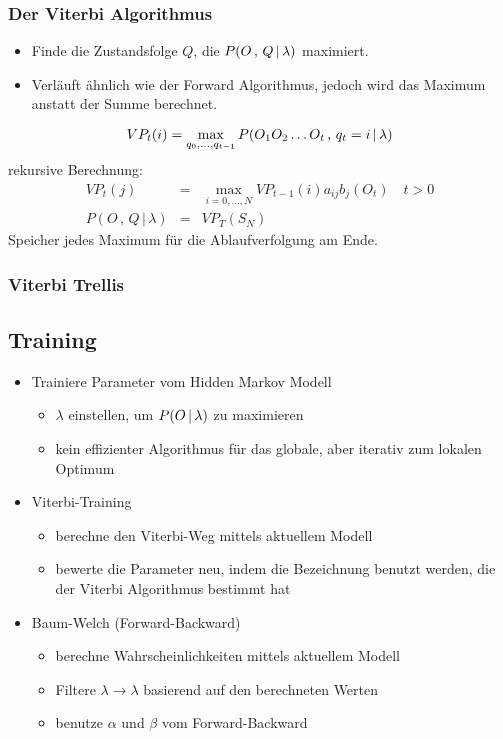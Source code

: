 \subsubsection*{Der Viterbi Algorithmus}

\begin{itemize}
\item Finde die Zustandsfolge $Q$, die $P(O \, , \, Q \, | \, \lambda)$ maximiert.
\item Verläuft ähnlich wie der Forward Algorithmus, jedoch wird das Maximum anstatt der Summe berechnet.
\end{itemize}
$$VP_t(i) = \max_{q_0, \dots, q_{t-1}} P(O_1O_2 \dots O_{t} \, , \, q_t = i \, | \, \lambda)$$
rekursive Berechnung:
\begin{eqnarray*}
VP_t(j) &=& \max_{i=0, \dots, N} VP_{t-1}(i) a_{ij}b_j(O_t) \quad t > 0 \\
P(O \, , \, Q \, | \, \lambda) &=& VP_T(S_N)
\end{eqnarray*}
Speicher jedes Maximum für die Ablaufverfolgung am Ende.

\subsubsection*{Viterbi Trellis}


\subsection{Training}

\begin{itemize}
\item Trainiere Parameter vom Hidden Markov Modell
\begin{itemize}
\item $\lambda$ einstellen, um $P(O \, | \, \lambda)$ zu maximieren
\item kein effizienter Algorithmus für das globale, aber iterativ zum lokalen Optimum
\end{itemize}
\item Viterbi-Training
\begin{itemize}
\item berechne den Viterbi-Weg mittels aktuellem Modell
\item bewerte die Parameter neu, indem die Bezeichnung benutzt werden, die der Viterbi Algorithmus bestimmt hat
\end{itemize}
\item Baum-Welch (Forward-Backward)
\begin{itemize}
\item berechne Wahrscheinlichkeiten mittels aktuellem Modell
\item Filtere $\lambda \to \lambda$ basierend auf den berechneten Werten
\item benutze $\alpha$ und $\beta$ vom Forward-Backward
\end{itemize}
\end{itemize}

